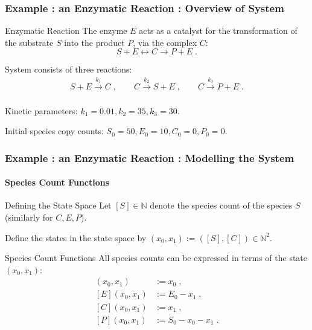 \documentclass[hyperref={colorlinks=true}]{beamer}
\begin{document}
\begin{frame}
\frametitle{Example : an Enzymatic Reaction : Overview of System}
\begin{block}{Enzymatic Reaction}
The enzyme $E$ acts as a catalyst for the transformation of the substrate $S$
into the product $P$, via the complex $C$:
\begin{equation*}
S + E \leftrightarrow{} C \rightarrow{} P + E \; .
\end{equation*}

System consists of three reactions:
\begin{gather*}
S + E \xrightarrow[]{k_1} C \; , \qquad{}
C \xrightarrow[]{k_2} S + E \; , \qquad{}
C \xrightarrow[]{k_3} P + E \; .
\end{gather*} 

Kinetic parameters: $k_1 = 0.01, k_2 = 35, k_3 = 30$.

Initial species copy counts: $S_0 = 50, E_0 = 10, C_0 = 0, P_0 = 0$.
\end{block}
\end{frame}

\begin{frame}
\frametitle{Example : an Enzymatic Reaction : Modelling the System}
\framesubtitle{Species Count Functions}
\begin{block}{Defining the State Space}
Let $[S] \in \mathbb{N}$ denote the species count of the species
$S$ (similarly for $C, E, P$).

Define the states in the state space by
$(x_0, x_1) := ([S], [C]) \in \mathbb{N}^2$.
\end{block}
\begin{block}{Species Count Functions}
All species counts can be expressed in terms of the state $(x_0, x_1)$:
\begin{align*}
[S](x_0, x_1) & := x_0 \; , \\
[E](x_0, x_1) & := E_0 - x_1 \; , \\
[C](x_0, x_1) & := x_1 \; , \\
[P](x_0, x_1) & := S_0 - x_0 - x_1 \; .
\end{align*}
\end{block}
\end{frame}
\end{document}
